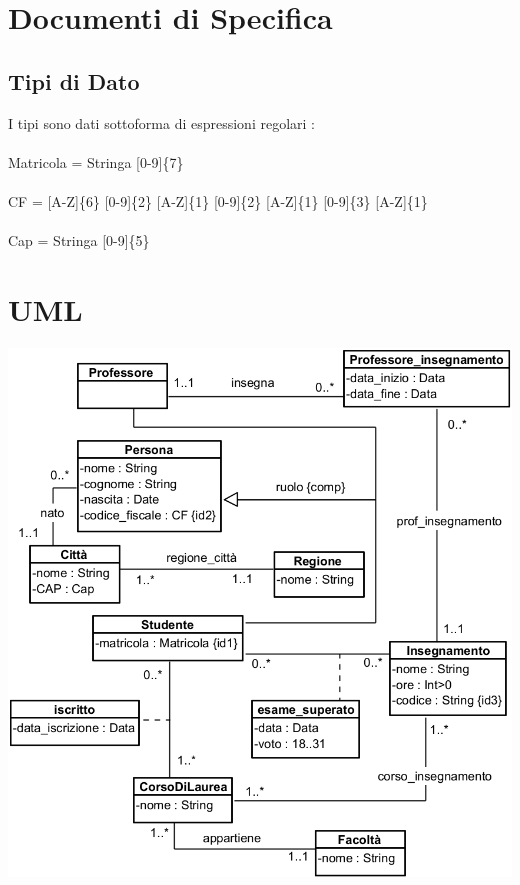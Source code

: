 \documentclass[12pt, letterpaper]{article}
\newcommand{\acc}{\\\hphantom{}\\}
\begin{document}
\section{Documenti di Specifica}
\subsection{Tipi di Dato}
I tipi sono dati sottoforma di espressioni regolari : \acc
Matricola = Stringa [0-9]\{7\}\acc 
CF = [A-Z]\{6\} [0-9]\{2\} [A-Z]\{1\} [0-9]\{2\} [A-Z]\{1\} [0-9]\{3\} [A-Z]\{1\}\acc 
Cap = Stringa [0-9]\{5\} 
\section{UML}
\includegraphics[width=\textwidth]{images/UML.png}
\end{document}
